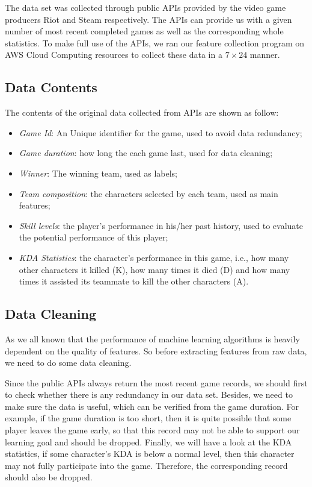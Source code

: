 \documentclass{article} %
\begin{document}
The data set was collected through public APIs provided by the video game producers Riot and Steam respectively. The APIs can provide us with a given number of most recent completed games as well as the corresponding whole statistics. To make full use of the APIs, we ran our feature collection program on AWS Cloud Computing resources to collect these data in a $7\times24$ manner.


\subsection{Data Contents}

The contents of the original data collected from APIs are shown as follow:


\begin{itemize}
\item \textit{Game Id}: An Unique identifier for the game, used to avoid data redundancy;
\item \textit{Game duration}: how long the each game last, used for data cleaning;
\item \textit{Winner}: The winning team, used as labels;
\item \textit{Team composition}: the characters selected by each team, used as main features;
\item \textit{Skill levels}: the player's performance in his/her past history, used to evaluate the potential performance of this player;
\item \textit{KDA Statistics}: the character's performance in this game, i.e., how many other characters it killed (K), how many times it died (D) and how many times it assisted its teammate to kill the other characters (A).
\end{itemize}

\subsection{Data Cleaning}

As we all known that the performance of machine learning algorithms is heavily dependent on the quality of features. So before extracting features from raw data, we need to do some data cleaning.

Since the public APIs always return the most recent game records, we should first to check whether there is any redundancy in our data set. Besides, we need to make sure the data is useful, which can be verified from the game duration. For example, if the game duration is too short, then it is quite possible that some player leaves the game early, so that this record may not be able to support our learning goal and should be dropped. Finally, we will have a look at the KDA statistics, if some character's KDA is below a normal level, then this character may not fully participate into the game. Therefore, the corresponding record should also be dropped.
\end{document}
